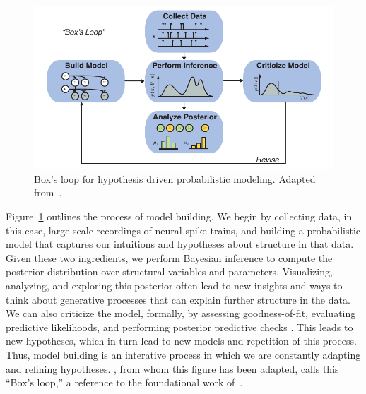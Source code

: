 \begin{figure}[t]
  \centering%
\includegraphics[width=5.5in]{figures/ch1/boxloop} 
\caption[Box's loop]{Box's loop for hypothesis driven probabilistic modeling.
Adapted from~\citet{blei2014build}.}
\label{fig:boxloop}
\end{figure}

Figure~\ref{fig:boxloop} outlines the process of model building.  We
begin by collecting data, in this case, large-scale recordings of
neural spike trains, and building a probabilistic model that captures
our intuitions and hypotheses about structure in that data. Given
these two ingredients, we perform Bayesian inference to compute the
posterior distribution over structural variables and
parameters. Visualizing, analyzing, and exploring this posterior often
lead to new insights and ways to think about generative processes that
can explain further structure in the data. We can also criticize the
model, formally, by assessing goodness-of-fit, evaluating predictive
likelihoods, and performing posterior predictive checks
\citep{Gelman13}. This leads to new hypotheses, which in turn lead to
new models and repetition of this process.  Thus, model building is an
interative process in which we are constantly adapting and refining
hypotheses.  \citet{blei2014build}, from whom this figure has been
adapted, calls this ``Box's loop,'' a reference to the foundational
work of~\citet{box1980sampling}.



